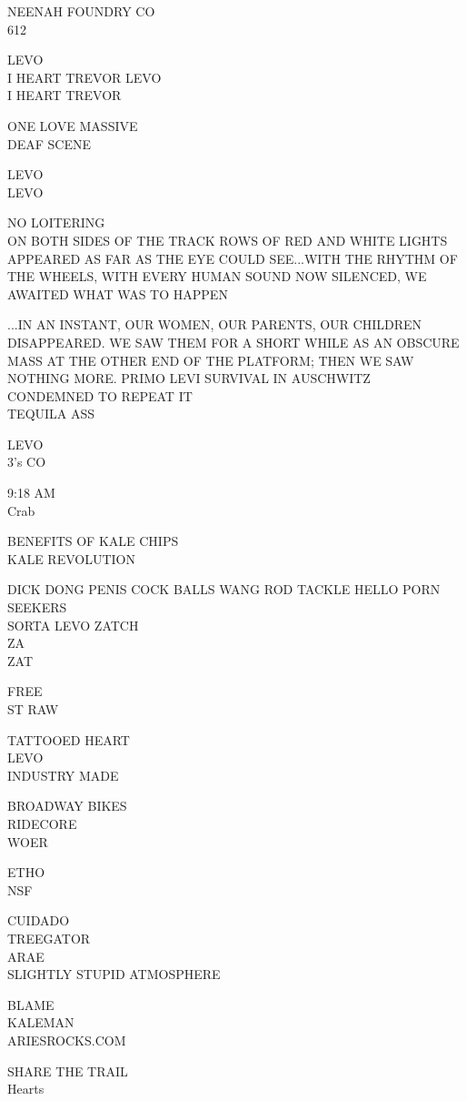 \documentclass[10pt,letterpaper]{article}
\begin{document}
NEENAH FOUNDRY CO\\
612

LEVO\\
I HEART TREVOR LEVO\\
I HEART TREVOR

ONE LOVE MASSIVE\\
DEAF SCENE

LEVO\\
LEVO

NO LOITERING\\
ON BOTH SIDES OF THE TRACK ROWS OF RED AND WHITE LIGHTS APPEARED AS FAR AS THE EYE COULD SEE...WITH THE RHYTHM OF THE WHEELS, WITH EVERY HUMAN SOUND NOW SILENCED, WE AWAITED WHAT WAS TO HAPPEN

...IN AN INSTANT, OUR WOMEN, OUR PARENTS, OUR CHILDREN DISAPPEARED.  WE SAW THEM FOR A SHORT WHILE AS AN OBSCURE MASS AT THE OTHER END OF THE PLATFORM; THEN WE SAW NOTHING MORE.  PRIMO LEVI  SURVIVAL IN AUSCHWITZ\\
CONDEMNED TO REPEAT IT\\
TEQUILA ASS

LEVO\\
3's CO

9:18 AM\\
Crab

BENEFITS OF KALE CHIPS\\
KALE REVOLUTION

DICK DONG PENIS COCK BALLS WANG ROD TACKLE HELLO PORN SEEKERS\\
SORTA LEVO ZATCH\\
ZA\\
ZAT

FREE\\
ST RAW

TATTOOED HEART\\
LEVO\\
INDUSTRY MADE

BROADWAY BIKES\\
RIDECORE\\
WOER

ETHO\\
NSF

CUIDADO\\
TREEGATOR\\
ARAE\\
SLIGHTLY STUPID ATMOSPHERE

BLAME\\
KALEMAN\\
ARIESROCKS.COM

SHARE THE TRAIL\\
Hearts
\end{document}
